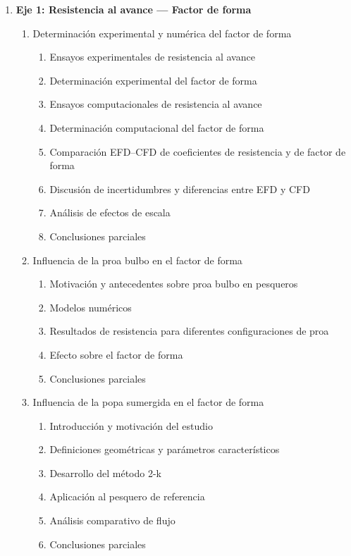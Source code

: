 \begin{enumerate}
  \item \textbf{Eje 1: Resistencia al avance — Factor de forma}
  \begin{enumerate}[label*=\arabic*.]
    \item Determinación experimental y numérica del factor de forma
    \begin{enumerate}[label*=\arabic*.]
      \item Ensayos experimentales de resistencia al avance 
      \item Determinación experimental del factor de forma 
      \item Ensayos computacionales de resistencia al avance
      \item Determinación computacional del factor de forma
      \item Comparación EFD–CFD de coeficientes de resistencia y de factor de forma
      \item Discusión de incertidumbres y diferencias entre EFD y CFD
      \item Análisis de efectos de escala
      \item Conclusiones parciales
    \end{enumerate}

    \item Influencia de la proa bulbo en el factor de forma
    \begin{enumerate}[label*=\arabic*.]
      \item Motivación y antecedentes sobre proa bulbo en pesqueros
      \item Modelos numéricos 
      \item Resultados de resistencia para diferentes configuraciones de proa
      \item Efecto sobre el factor de forma
      \item Conclusiones parciales
    \end{enumerate}
    
    \item Influencia de la popa sumergida en el factor de forma
    \begin{enumerate}[label*=\arabic*.]
       \item Introducción y motivación del estudio
       \item Definiciones geométricas y parámetros característicos
       \item Desarrollo del método 2-k
       \item Aplicación al pesquero de referencia
       \item Análisis comparativo de flujo
       \item Conclusiones parciales
    \end{enumerate}    
    

\end{enumerate}
\end{enumerate}
